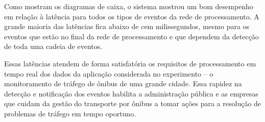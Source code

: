 
  Como mostram os diagramas de caixa, o sistema mostrou um bom desempenho em relação à latência para todos os tipos de eventos da rede de processamento. A grande maioria das latências fica abaixo de cem milissegundos, mesmo para os eventos que estão no final da rede de processamento e que dependem da detecção de toda uma cadeia de eventos. 
  
  Essas latências atendem de forma satisfatória os requisitos de processamento em tempo real dos dados da aplicação considerada no experimento -- o monitoramento de tráfego de ônibus de uma grande cidade. Essa rapidez na detecção e notificação dos eventos habilita a administração pública e as empresas que cuidam da gestão do transporte por ônibus a tomar ações para a resolução de problemas de tráfego em tempo oportuno. 
  






